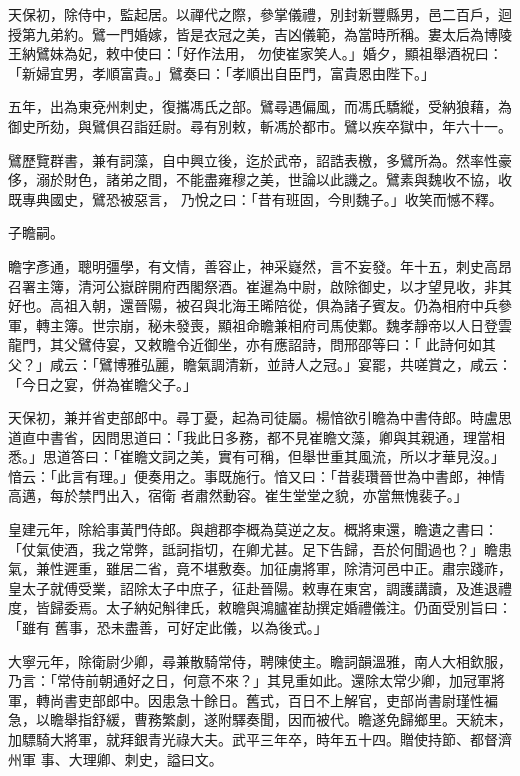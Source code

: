 \begin{pinyinscope}
 天保初，除侍中，監起居。以禪代之際，參掌儀禮，別封新豐縣男，邑二百戶，迴授第九弟約。鷿一門婚嫁，皆是衣冠之美，吉凶儀範，為當時所稱。婁太后為博陵王納鷿妹為妃，敕中使曰：「好作法用，
 勿使崔家笑人。」婚夕，顯祖舉酒祝曰：「新婦宜男，孝順富貴。」鷿奏曰：「孝順出自臣門，富貴恩由陛下。」



 五年，出為東兗州刺史，復攜馮氏之部。鷿尋遇偏風，而馮氏驕縱，受納狼藉，為御史所劾，與鷿俱召詣廷尉。尋有別敕，斬馮於都市。鷿以疾卒獄中，年六十一。



 鷿歷覽群書，兼有詞藻，自中興立後，迄於武帝，詔誥表檄，多鷿所為。然率性豪侈，溺於財色，諸弟之間，不能盡雍穆之美，世論以此譏之。鷿素與魏收不協，收既專典國史，鷿恐被惡言，
 乃悅之曰：「昔有班固，今則魏子。」收笑而憾不釋。



 子瞻嗣。



 瞻字彥通，聰明彊學，有文情，善容止，神采嶷然，言不妄發。年十五，刺史高昂召署主簿，清河公嶽辟開府西閣祭酒。崔暹為中尉，啟除御史，以才望見收，非其好也。高祖入朝，還晉陽，被召與北海王晞陪從，俱為諸子賓友。仍為相府中兵參軍，轉主簿。世宗崩，秘未發喪，顯祖命瞻兼相府司馬使鄴。魏孝靜帝以人日登雲龍門，其父鷿侍宴，又敕瞻令近御坐，亦有應詔詩，問邢邵等曰：「
 此詩何如其父？」咸云：「鷿博雅弘麗，瞻氣調清新，並詩人之冠。」宴罷，共嗟賞之，咸云：「今日之宴，併為崔瞻父子。」



 天保初，兼并省吏部郎中。尋丁憂，起為司徒屬。楊愔欲引瞻為中書侍郎。時盧思道直中書省，因問思道曰：「我此日多務，都不見崔瞻文藻，卿與其親通，理當相悉。」思道答曰：「崔瞻文詞之美，實有可稱，但舉世重其風流，所以才華見沒。」愔云：「此言有理。」便奏用之。事既施行。愔又曰：「昔裴瓚晉世為中書郎，神情高邁，每於禁門出入，宿衛
 者肅然動容。崔生堂堂之貌，亦當無愧裴子。」



 皇建元年，除給事黃門侍郎。與趙郡李概為莫逆之友。概將東還，瞻遺之書曰：「仗氣使酒，我之常弊，詆訶指切，在卿尤甚。足下告歸，吾於何聞過也？」瞻患氣，兼性遲重，雖居二省，竟不堪敷奏。加征虜將軍，除清河邑中正。肅宗踐祚，皇太子就傅受業，詔除太子中庶子，征赴晉陽。敕專在東宮，調護講讀，及進退禮度，皆歸委焉。太子納妃斛律氏，敕瞻與鴻臚崔劼撰定婚禮儀注。仍面受別旨曰：「雖有
 舊事，恐未盡善，可好定此儀，以為後式。」



 大寧元年，除衛尉少卿，尋兼散騎常侍，聘陳使主。瞻詞韻溫雅，南人大相欽服，乃言：「常侍前朝通好之日，何意不來？」其見重如此。還除太常少卿，加冠軍將軍，轉尚書吏部郎中。因患急十餘日。舊式，百日不上解官，吏部尚書尉瑾性褊急，以瞻舉指舒緩，曹務繁劇，遂附驛奏聞，因而被代。瞻遂免歸鄉里。天統末，加驃騎大將軍，就拜銀青光祿大夫。武平三年卒，時年五十四。贈使持節、都督濟州軍
 事、大理卿、刺史，謚曰文。




\end{pinyinscope}
